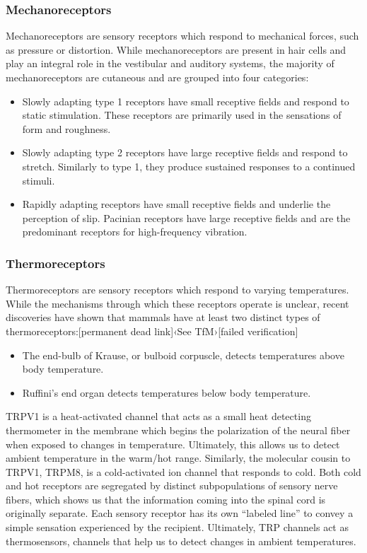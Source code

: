\hypertarget{mechanoreceptors}{%
\subsubsection{Mechanoreceptors}\label{mechanoreceptors}}

Mechanoreceptors are sensory receptors which respond to mechanical
forces, such as pressure or distortion. While mechanoreceptors are
present in hair cells and play an integral role in the vestibular and
auditory systems, the majority of mechanoreceptors are cutaneous and are
grouped into four categories:

\begin{itemize}
\tightlist
\item
  Slowly adapting type 1 receptors have small receptive fields and
  respond to static stimulation. These receptors are primarily used in
  the sensations of form and roughness.
\item
  Slowly adapting type 2 receptors have large receptive fields and
  respond to stretch. Similarly to type 1, they produce sustained
  responses to a continued stimuli.
\item
  Rapidly adapting receptors have small receptive fields and underlie
  the perception of slip. Pacinian receptors have large receptive fields
  and are the predominant receptors for high-frequency vibration.
\end{itemize}

\hypertarget{thermoreceptors}{%
\subsubsection{Thermoreceptors}\label{thermoreceptors}}

Thermoreceptors are sensory receptors which respond to varying
temperatures. While the mechanisms through which these receptors operate
is unclear, recent discoveries have shown that mammals have at least two
distinct types of thermoreceptors:{[}permanent dead link{]}‹See
TfM›{[}failed verification{]}

\begin{itemize}
\tightlist
\item
  The end-bulb of Krause, or bulboid corpuscle, detects temperatures
  above body temperature.
\item
  Ruffini's end organ detects temperatures below body temperature.
\end{itemize}

TRPV1 is a heat-activated channel that acts as a small heat detecting
thermometer in the membrane which begins the polarization of the neural
fiber when exposed to changes in temperature. Ultimately, this allows us
to detect ambient temperature in the warm/hot range. Similarly, the
molecular cousin to TRPV1, TRPM8, is a cold-activated ion channel that
responds to cold. Both cold and hot receptors are segregated by distinct
subpopulations of sensory nerve fibers, which shows us that the
information coming into the spinal cord is originally separate. Each
sensory receptor has its own ``labeled line'' to convey a simple
sensation experienced by the recipient. Ultimately, TRP channels act as
thermosensors, channels that help us to detect changes in ambient
temperatures.

